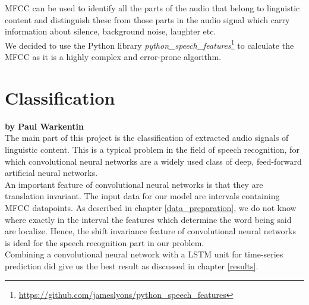 MFCC can be used to identify all the parts of the audio that belong to linguistic content and distinguish these from those parts in the audio signal which carry information about silence, background noise, laughter etc. \\

We decided to use the Python library \textit{python\_speech\_features}\footnote{\url{https://github.com/jameslyons/python_speech_features}} to calculate the MFCC as it is a highly complex and error-prone algorithm.

\section{Classification}

\textbf{by Paul Warkentin} \\

The main part of this project is the classification of extracted audio signals of linguistic content. This is a typical problem in the field of speech recognition, for which convolutional neural networks are a widely used class of deep, feed-forward artificial neural networks. \\

An important feature of convolutional neural networks is that they are translation invariant. The input data for our model are intervals containing MFCC datapoints. As described in chapter \ref{data_preparation}, we do not know where exactly in the interval the features which determine the word being said are localize. Hence, the shift invariance feature of convolutional neural networks is ideal for the speech recognition part in our problem. \\

Combining a convolutional neural network with a LSTM unit for time-series prediction did give us the best result as discussed in chapter \ref{results}.
